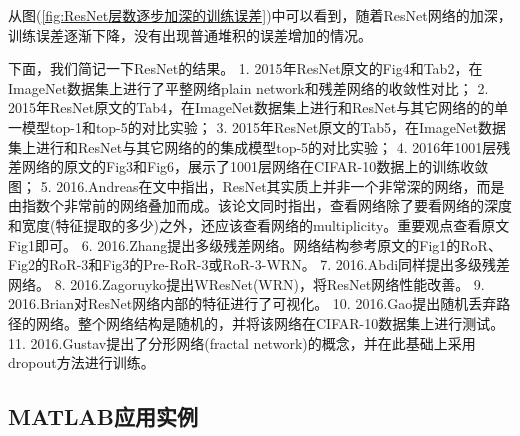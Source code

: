             从图(\ref{fig:ResNet层数逐步加深的训练误差})中可以看到，随着ResNet网络的加深，训练误差逐渐下降，没有出现普通堆积的误差增加的情况。
            \par
            下面，我们简记一下ResNet的结果。
            1. 2015年ResNet原文\cite{2015.HeKaiming}的Fig4和Tab2，在ImageNet数据集上进行了平整网络plain network和残差网络的收敛性对比；
            2. 2015年ResNet原文\cite{2015.HeKaiming}的Tab4，在ImageNet数据集上进行和ResNet与其它网络的的单一模型top-1和top-5的对比实验；
            3. 2015年ResNet原文\cite{2015.HeKaiming}的Tab5，在ImageNet数据集上进行和ResNet与其它网络的的集成模型top-5的对比实验；
            4. 2016年1001层残差网络的原文\cite{2016.Kaiming}的Fig3和Fig6，展示了1001层网络在CIFAR-10数据上的训练收敛图；
            5. 2016.Andreas在文\cite{2016.Andreas}中指出，ResNet其实质上并非一个非常深的网络，而是由指数个非常前的网络叠加而成。该论文同时指出，查看网络除了要看网络的深度和宽度(特征提取的多少)之外，还应该查看网络的multiplicity。重要观点查看原文Fig1即可。
            6. 2016.Zhang\cite{2016.Zhang}提出多级残差网络。网络结构参考原文\cite{2016.Zhang}的Fig1的RoR、Fig2的RoR-3和Fig3的Pre-RoR-3或RoR-3-WRN。
            7. 2016.Abdi\cite{2016.Abdi}同样提出多级残差网络。
            8. 2016.Zagoruyko\cite{2016.Zagoruyko}提出WResNet(WRN)，将ResNet网络性能改善。
            9. 2016.Brian\cite{2016.Brian}对ResNet网络内部的特征进行了可视化。
            10. 2016.Gao\cite{2016.Gao}提出随机丢弃路径的网络。整个网络结构是随机的，并将该网络在CIFAR-10数据集上进行测试。
            11. 2016.Gustav\cite{2016.Gustav}提出了分形网络(fractal network)的概念，并在此基础上采用dropout方法进行训练。
    \subsection{MATLAB应用实例}
